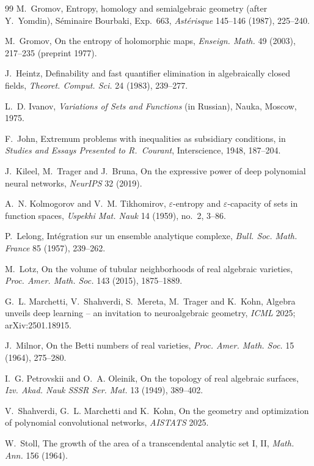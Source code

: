 \documentclass[11pt]{article}
\begin{document}
\begin{thebibliography}{99}
 M.~Gromov, Entropy, homology and semialgebraic geometry (after
Y.~Yomdin), S\'eminaire Bourbaki, Exp.~663, \emph{Ast\'erisque} 145--146
(1987), 225--240.

 M.~Gromov, On the entropy of holomorphic maps, \emph{Enseign.
Math.} 49 (2003), 217--235 (preprint 1977).

 J.~Heintz, Definability and fast quantifier elimination in
algebraically closed fields, \emph{Theoret. Comput. Sci.} 24 (1983), 239--277.

 L.~D. Ivanov, \emph{Variations of Sets and Functions} (in
Russian), Nauka, Moscow, 1975.

 F.~John, Extremum problems with inequalities as subsidiary
conditions, in \emph{Studies and Essays Presented to R.~Courant}, Interscience,
1948, 187--204.

 J.~Kileel, M.~Trager and J.~Bruna, On the expressive power of
deep polynomial neural networks, \emph{NeurIPS} 32 (2019).

 A.~N. Kolmogorov and V.~M. Tikhomirov, $\varepsilon$-entropy and
$\varepsilon$-capacity of sets in function spaces, \emph{Uspekhi Mat. Nauk}
14 (1959), no.~2, 3--86.

 P.~Lelong, Int\'egration sur un ensemble analytique complexe,
\emph{Bull. Soc. Math. France} 85 (1957), 239--262.

 M.~Lotz, On the volume of tubular neighborhoods of real
algebraic varieties, \emph{Proc. Amer. Math. Soc.} 143 (2015), 1875--1889.

 G.~L. Marchetti, V.~Shahverdi, S.~Mereta, M.~Trager and
K.~Kohn, Algebra unveils deep learning -- an invitation to neuroalgebraic
geometry, \emph{ICML} 2025; arXiv:2501.18915.

 J.~Milnor, On the Betti numbers of real varieties, \emph{Proc.
Amer. Math. Soc.} 15 (1964), 275--280.

 I.~G. Petrovskii and O.~A. Oleinik, On the topology of real
algebraic surfaces, \emph{Izv. Akad. Nauk SSSR Ser. Mat.} 13 (1949), 389--402.

 V.~Shahverdi, G.~L. Marchetti and K.~Kohn, On the geometry and
optimization of polynomial convolutional networks, \emph{AISTATS} 2025.

 W.~Stoll, The growth of the area of a transcendental analytic
set I, II, \emph{Math. Ann.} 156 (1964).


\end{thebibliography}
\end{document}
